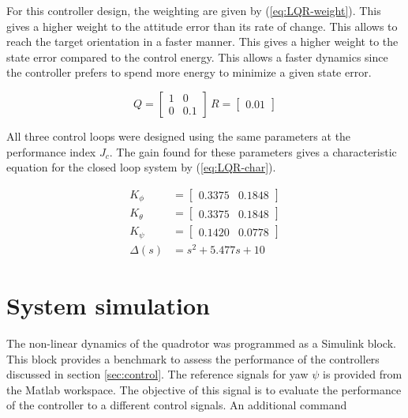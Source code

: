 \documentclass[12pt]{article}
\begin{document}
For this controller design, the weighting are given by (\ref{eq:LQR-weight}). This gives a higher weight to the attitude error than its rate of change. This allows to reach the target orientation in a faster manner. This gives a higher weight to the state error compared to the control energy. This allows a faster dynamics since the controller prefers to spend more energy to minimize a given state error.

\begin{equation}
  \label{eq:LQR-weight}
  Q = \begin{bmatrix} 1 & 0 \\ 0 & 0.1 \end{bmatrix} \, R = \begin{bmatrix} 0.01 \end{bmatrix}
\end{equation}

All three control loops were designed using the same parameters at the performance index $J_c$. The gain found for these parameters gives a characteristic equation for the closed loop system by (\ref{eq:LQR-char}).

\begin{equation}
  \label{eq:LQR-char}
  \begin{split}
    K_\phi     &= \begin{bmatrix} 0.3375 & 0.1848 \end{bmatrix} \\
    K_\theta   &= \begin{bmatrix} 0.3375 & 0.1848 \end{bmatrix} \\
    K_\psi     &= \begin{bmatrix} 0.1420 & 0.0778 \end{bmatrix} \\
    \Delta (s) &= s^2 + 5.477 s + 10
  \end{split}
\end{equation}

\section{System simulation}
The non-linear dynamics of the quadrotor was programmed as a Simulink block. This block provides a benchmark to assess the performance of the controllers discussed in section \ref{sec:control}. The reference signals for yaw $ \psi$ is provided from the Matlab workspace. The objective of this signal is to evaluate the performance of the controller to a different control signals. An additional command %
\end{document}
